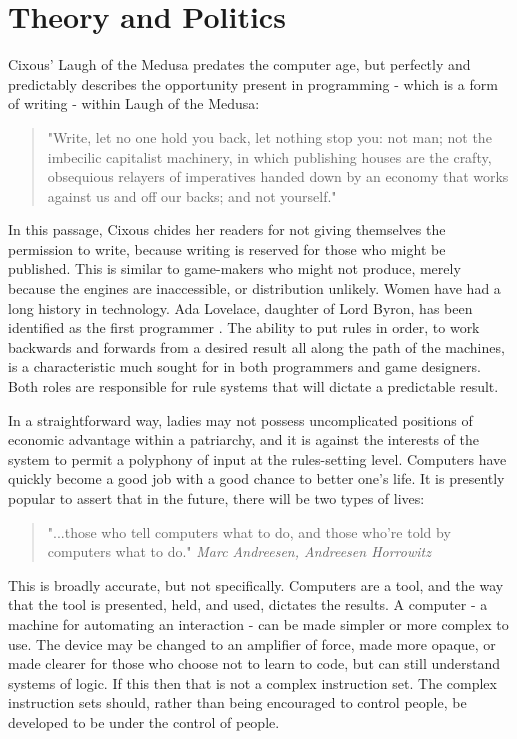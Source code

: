 \section{Theory and Politics}
Cixous' Laugh of the Medusa predates the computer age, but perfectly and predictably describes the opportunity present in programming - which is a form of writing - within Laugh of the Medusa:
\begin{quote}
"Write, let no one hold you back, let nothing stop you: not man; not the imbecilic capitalist machinery, in which publishing houses are the crafty, obsequious relayers of imperatives handed down by an economy that works against us and off our backs; and not yourself." 
\textit{\parencite{cixous}}
\end{quote}

In this passage, Cixous chides her readers for not giving themselves the permission to write, because writing is reserved for those who might be published. This is similar to game-makers who might not produce, merely because the engines are inaccessible, or distribution unlikely. Women have had a long history in technology.
Ada Lovelace, daughter of Lord Byron, has been identified as the first programmer \parencite{plant}. The ability to put rules in order, to work backwards and forwards from a desired result all along the path of the machines, is a characteristic much sought for in both programmers and game designers. Both roles are responsible for rule systems that will dictate a predictable result.

In a straightforward way, ladies may not possess uncomplicated positions of economic advantage within a patriarchy, and it is against the interests of the system to permit a polyphony of input at the rules-setting level. Computers have quickly become a good job with a good chance to better one's life. It is presently popular to assert that in the future, there will be two types of lives:

\begin{quote}
"...those who tell computers what to do, and those who're told by computers what to do."
\textit{Marc Andreesen, Andreesen Horrowitz}
\end{quote}

This is broadly accurate, but not specifically. Computers are a tool, and the way that the tool is presented, held, and used, dictates the results. A computer - a machine for automating an interaction - can be made simpler or more complex to use. The device may be changed to an amplifier of force, made more opaque, or made clearer for those who choose not to learn to code, but can still understand systems of logic. If this then that is not a complex instruction set. The complex instruction sets should, rather than being encouraged to control people, be developed to be under the control of people.

